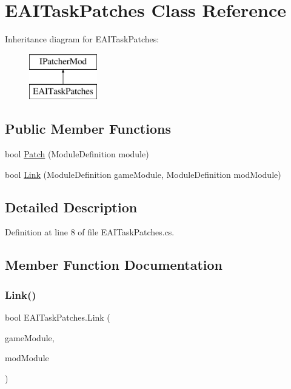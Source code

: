 \hypertarget{class_e_a_i_task_patches}{}\section{E\+A\+I\+Task\+Patches Class Reference}
\label{class_e_a_i_task_patches}
Inheritance diagram for E\+A\+I\+Task\+Patches\+:\begin{figure}[H]
\begin{center}
\leavevmode
\includegraphics[height=2.000000cm]{d5/d0f/class_e_a_i_task_patches}
\end{center}
\end{figure}
\subsection*{Public Member Functions}
\begin{DoxyCompactItemize}
\item 
bool \mbox{\hyperlink{class_e_a_i_task_patches_a4ea2b64e82ea53f968647c054eaa79a1}{Patch}} (Module\+Definition module)
\item 
bool \mbox{\hyperlink{class_e_a_i_task_patches_aec9d31ae76740873a426d179f4bfa5b0}{Link}} (Module\+Definition game\+Module, Module\+Definition mod\+Module)
\end{DoxyCompactItemize}


\subsection{Detailed Description}


Definition at line 8 of file E\+A\+I\+Task\+Patches.\+cs.



\subsection{Member Function Documentation}
\mbox{\label{class_e_a_i_task_patches_aec9d31ae76740873a426d179f4bfa5b0}} 
\subsubsection{\texorpdfstring{Link()}{Link()}}
{\footnotesize\ttfamily bool E\+A\+I\+Task\+Patches.\+Link (\begin{DoxyParamCaption}\item[{Module\+Definition}]{game\+Module,  }\item[{Module\+Definition}]{mod\+Module }\end{DoxyParamCaption})}



